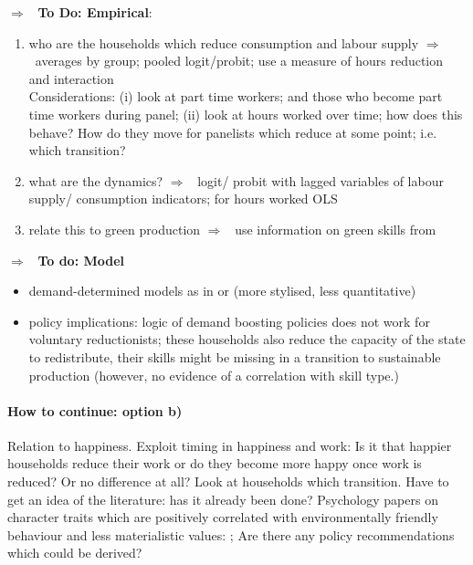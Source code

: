 \documentclass[12pt]{article}
\newcommand{\ar}{$\Rightarrow$ \ }
\newcommand{\tr}[1]{\textcolor{red}{#1}}
\begin{document}
\ar \textbf{To Do: Empirical}:
\begin{enumerate}
\item who are the households which reduce consumption and labour supply \ar averages by group; pooled logit/probit; use a measure of hours reduction and interaction\\ 
Considerations:
(i) look at part time workers; and those who become part time workers during panel; (ii) look at hours worked over time; how does this behave? How do they move for panelists which reduce at some point; i.e. which transition? 
\item what are the dynamics? \ar logit/ probit with lagged variables of labour supply/ consumption indicators; for hours worked OLS
\item  relate this to green production \ar use information on green skills from \cite{Consoli2016DoCapital} \checkmark
\end{enumerate}

\ar \textbf{To do: Model}
\begin{itemize}
\item demand-determined models as in \cite{Michaillat2015AggregateUnemployment} or (more stylised, less quantitative) \cite{Auerbach2021InequalityEconomy}
\item policy implications: logic of demand boosting policies does not work for voluntary reductionists; these households also reduce the capacity of the state to redistribute, their skills might be missing in a transition to sustainable production (however, no evidence of a correlation with skill type.)
\end{itemize}

\paragraph{How to continue: option b)}
 Relation to happiness. Exploit timing in happiness and work: Is it that happier households reduce their work or do they become more happy once work is reduced? Or no difference at all? Look at households which transition. 
 Have to get an idea of the literature: has it already been done? Psychology papers on character traits which are positively correlated with environmentally friendly behaviour and less materialistic values: \cite{Brown2005AreLifestyle,Heikkinen2015DegrowthConsumers}; Are there any policy recommendations which could be derived?
\end{document}
